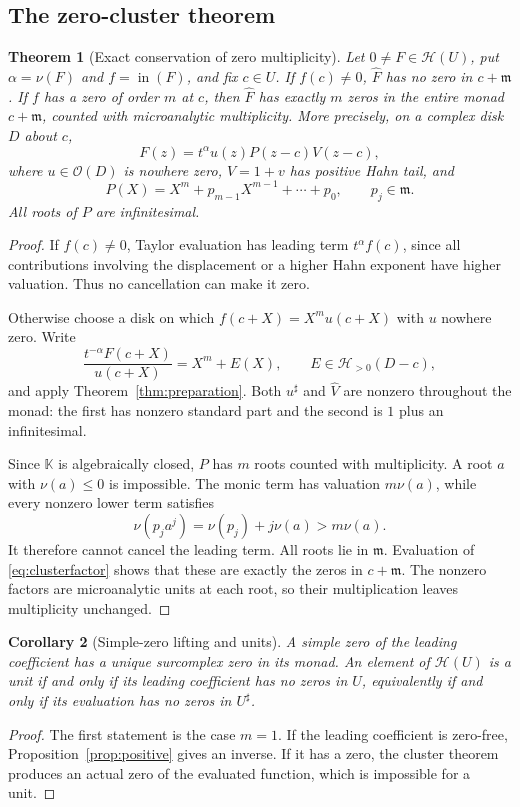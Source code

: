 \documentclass[11pt,oneside]{article}
\newtheorem{theorem}{Theorem}[section]
\newtheorem{corollary}[theorem]{Corollary}
\theoremstyle{definition}\newtheorem{definition}[theorem]{Definition}
\newcommand{\K}{\mathbb K}
\newcommand{\HH}{\mathcal H}
\newcommand{\OO}{\mathcal O}
\newcommand{\mm}{\mathfrak m}
\newcommand{\hatF}{\widehat F}
\newcommand{\val}{\nu}
\newcommand{\lead}{\operatorname{in}}
\begin{document}
\subsection{The zero-cluster theorem}
\begin{theorem}[Exact conservation of zero multiplicity]\label{thm:cluster}
Let $0\ne F\in\HH(U)$, put $\alpha=\val(F)$ and $f=\lead(F)$, and fix $c\in U$.
If $f(c)\ne0$, $\hatF$ has no zero in $c+\mm$.
If $f$ has a zero of order $m$ at $c$, then $\hatF$ has exactly $m$ zeros in the entire monad $c+\mm$, counted with microanalytic multiplicity. More precisely, on a complex disk $D$ about $c$,
\begin{equation}\label{eq:clusterfactor}
 F(z)=t^\alpha u(z)P(z-c)V(z-c),
\end{equation}
where $u\in\OO(D)$ is nowhere zero, $V=1+v$ has positive Hahn tail, and
\[
 P(X)=X^m+p_{m-1}X^{m-1}+\cdots+p_0,\qquad p_j\in\mm.
\]
All roots of $P$ are infinitesimal.
\end{theorem}
\begin{proof}
If $f(c)\ne0$, Taylor evaluation has leading term $t^\alpha f(c)$, since all contributions involving the displacement or a higher Hahn exponent have higher valuation. Thus no cancellation can make it zero.

Otherwise choose a disk on which $f(c+X)=X^mu(c+X)$ with $u$ nowhere zero. Write
\[
 \frac{t^{-\alpha}F(c+X)}{u(c+X)}=X^m+E(X),\qquad E\in\HH_{>0}(D-c),
\]
and apply Theorem~\ref{thm:preparation}. Both $u^\sharp$ and $\widehat V$ are nonzero throughout the monad: the first has nonzero standard part and the second is $1$ plus an infinitesimal.

Since $\K$ is algebraically closed, $P$ has $m$ roots counted with multiplicity. A root $a$ with $\val(a)\leq0$ is impossible. The monic term has valuation $m\val(a)$, while every nonzero lower term satisfies
\[
 \val(p_ja^j)=\val(p_j)+j\val(a)>m\val(a).
\]
It therefore cannot cancel the leading term. All roots lie in $\mm$. Evaluation of \eqref{eq:clusterfactor} shows that these are exactly the zeros in $c+\mm$. The nonzero factors are microanalytic units at each root, so their multiplication leaves multiplicity unchanged.
\end{proof}

\begin{corollary}[Simple-zero lifting and units]\label{cor:simple}
A simple zero of the leading coefficient has a unique surcomplex zero in its monad. An element of $\HH(U)$ is a unit if and only if its leading coefficient has no zeros in $U$, equivalently if and only if its evaluation has no zeros in $U^\sharp$.
\end{corollary}
\begin{proof}
The first statement is the case $m=1$. If the leading coefficient is zero-free, Proposition~\ref{prop:positive} gives an inverse. If it has a zero, the cluster theorem produces an actual zero of the evaluated function, which is impossible for a unit.
\end{proof}
\end{document}
